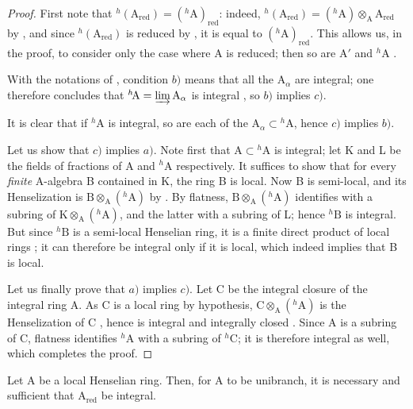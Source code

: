 \begin{proof}
First note that ${}^h(\mathrm{A}_{\mathrm{red}})=({}^h\!\mathrm{A})_{\mathrm{red}}$: indeed, ${}^h(\mathrm{A}_{\mathrm{red}})=({}^h\!\mathrm{A})\otimes_{\mathrm{A}}\mathrm{A}_{\mathrm{red}}$ by , and since ${}^h(\mathrm{A}_{\mathrm{red}})$ is reduced by , it is equal to $({}^h\!\mathrm{A})_{\mathrm{red}}$.
This allows us, in the proof, to consider only the case where A is reduced; then so are $\mathrm{A}'$  and ${}^h\!\mathrm{A}$ .

With the notations of , condition $b)$ means that all the $\mathrm{A}_\alpha$ are integral; one therefore concludes that ${}^h\!\mathrm{A}=\varinjlim\mathrm{A}_\alpha$ is integral , so $b)$ implies $c)$.

It is clear that if ${}^h\!\mathrm{A}$ is integral, so are each of the $\mathrm{A}_\alpha\subset{}^h\!\mathrm{A}$, hence $c)$ implies $b)$.

Let us show that $c)$ implies $a)$.
Note first that $\mathrm{A}\subset{}^h\!\mathrm{A}$ is integral;
let K and L be the fields of fractions of A and ${}^h\!\mathrm{A}$ respectively.
It suffices to show that for every \emph{finite} A-algebra B contained in K, the ring B is local.  Now B is semi-local, and its Henselization is $\mathrm{B}\otimes_{\mathrm{A}}({}^h\!\mathrm{A})$ by .  By flatness, $\mathrm{B}\otimes_{\mathrm{A}}({}^h\!\mathrm{A})$ identifies with a subring of $\mathrm{K}\otimes_{\mathrm{A}}({}^h\!\mathrm{A})$, and the latter with a subring of L; hence ${}^h\!\mathrm{B}$ is integral.  But since ${}^h\!\mathrm{B}$ is a semi-local Henselian ring, it is a finite direct product of local rings ; it can therefore be integral only if it is local, which indeed implies that B is local.

Let us finally prove that $a)$ implies $c)$.
Let C be the integral closure of the integral ring A.
As C is a local ring by hypothesis, $\mathrm{C}\otimes_{\mathrm{A}}({}^h\!\mathrm{A})$ is the Henselization of C , hence is integral and integrally closed .
Since A is a subring of C, flatness identifies ${}^h\!\mathrm{A}$ with a subring of ${}^h\!\mathrm{C}$; it is therefore integral as well, which completes the proof.
\end{proof}

\begin{corollary}[18.6.13]
\label{IV.18.6.13}
Let $\mathrm{A}$ be a local Henselian ring.
Then, for A to be unibranch, it is necessary and sufficient that $\mathrm{A}_{\mathrm{red}}$ be integral.
\end{corollary}

